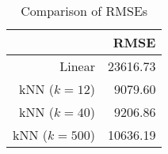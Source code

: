 \begin{table}[ht]
\centering
\begin{tabular}{rr}
  \hline
 & RMSE \\ 
  \hline
Linear & 23616.73 \\ 
  kNN ($k=12$) & 9079.60 \\ 
  kNN ($k=40$) & 9206.86 \\ 
  kNN ($k=500$) & 10636.19 \\ 
   \hline
\end{tabular}
\caption{Comparison of RMSEs} 
\label{tab:rmse_compare}
\end{table}
